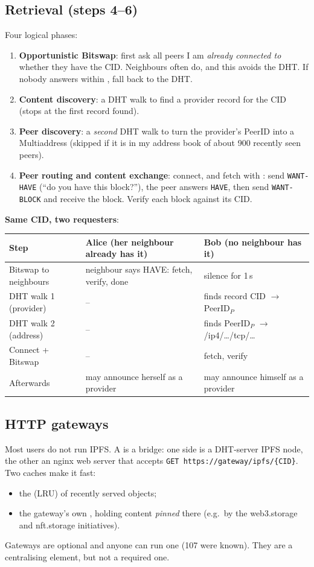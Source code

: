 \subsection{Retrieval (steps 4--6)}
Four logical phases:
\begin{enumerate}
  \item[(4)]\textbf{Opportunistic Bitswap}: first ask all peers I am \emph{already connected to} whether they have the CID. Neighbours often do, and this avoids the DHT.
        If nobody answers within , fall back to the DHT.
  \item[(5)]\textbf{Content discovery}: a DHT walk to find a provider record for the CID (stops at the first record found).
  \item[(5b)] \textbf{Peer discovery}: a \emph{second} DHT walk to turn the provider's PeerID into a Multiaddress (skipped if it is in my address book of about 900 recently seen peers).
  \item[(6)]\textbf{Peer routing and content exchange}: connect, and fetch with : send \texttt{WANT-HAVE} (``do you have this block?''), the peer answers
        \texttt{HAVE}, then send \texttt{WANT-BLOCK} and receive the block. Verify each block against its CID.
\end{enumerate}

\textbf{Same CID, two requesters}:
\begin{center}
\small
\begin{tabularx}{\linewidth}{@{}lXX@{}}
\toprule
Step & Alice (her neighbour already has it) & Bob (no neighbour has it)\\
\midrule
Bitswap to neighbours & neighbour says HAVE: fetch, verify, done & silence for 1\,s\\
DHT walk 1 (provider) & -- & finds record CID $\to$ PeerID$_P$\\
DHT walk 2 (address) & -- & finds PeerID$_P$ $\to$ /ip4/\dots/tcp/\dots\\
Connect + Bitswap & -- & fetch, verify\\
Afterwards & may announce herself as a provider & may announce himself as a provider\\
\bottomrule
\end{tabularx}
\end{center}

\subsection{HTTP gateways}
Most users do not run IPFS. A  is a bridge: one side is a DHT-server IPFS node, the other an nginx web server that accepts
\texttt{GET https://gateway/ipfs/\{CID\}}. Two caches make it fast:
\begin{itemize}
  \item the  (LRU) of recently served objects;
  \item the gateway's own , holding content \emph{pinned} there (e.g.\ by the web3.storage and nft.storage initiatives).
\end{itemize}
Gateways are optional and anyone can run one (107 were known). They are a centralising element, but not a required one.

